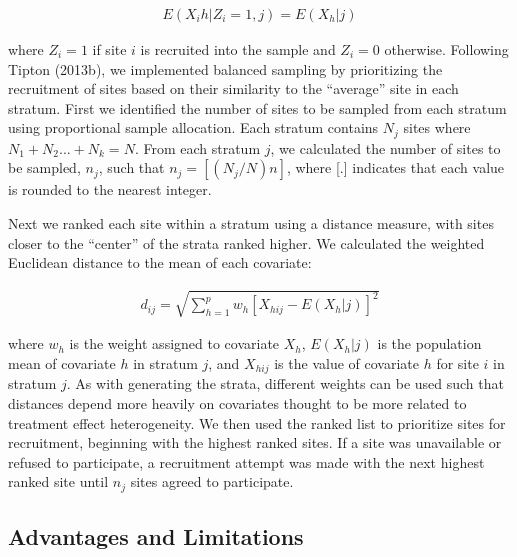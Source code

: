 \documentclass[man,floatsintext]{apa6}
\begin{document}
\begin{align}
  E(X_ih|Z_i = 1, j) = E(X_h|j)
\end{align}

where \(Z_i = 1\) if site \(i\) is recruited into the sample and \(Z_i = 0\) otherwise. Following Tipton (2013b), we implemented balanced sampling by prioritizing the recruitment of sites based on their similarity to the \enquote{average} site in each stratum. First we identified the number of sites to be sampled from each stratum using proportional sample allocation. Each stratum contains \(N_j\) sites where \(N_1 + N_2 ... + N_k = N\). From each stratum \(j\), we calculated the number of sites to be sampled, \(n_j\), such that \(n_j = [(N_j/N)n]\), where {[}.{]} indicates that each value is rounded to the nearest integer.

Next we ranked each site within a stratum using a distance measure, with sites closer to the \enquote{center} of the strata ranked higher. We calculated the weighted Euclidean distance to the mean of each covariate:

\begin{align} \label{eq:euclid}
  d_{ij} = \sqrt{\sum^p_{h=1}w_h[X_{hij} - E(X_h|j)]^2}
\end{align}

where \(w_h\) is the weight assigned to covariate \(X_h\), \(E(X_h|j)\) is the population mean of covariate \(h\) in stratum \(j\), and \(X_{hij}\) is the value of covariate \(h\) for site \(i\) in stratum \(j\). As with generating the strata, different weights can be used such that distances depend more heavily on covariates thought to be more related to treatment effect heterogeneity. We then used the ranked list to prioritize sites for recruitment, beginning with the highest ranked sites. If a site was unavailable or refused to participate, a recruitment attempt was made with the next highest ranked site until \(n_j\) sites agreed to participate.

\hypertarget{advantages-and-limitations}{%
\subsection{Advantages and Limitations}\label{advantages-and-limitations}}
\end{document}
